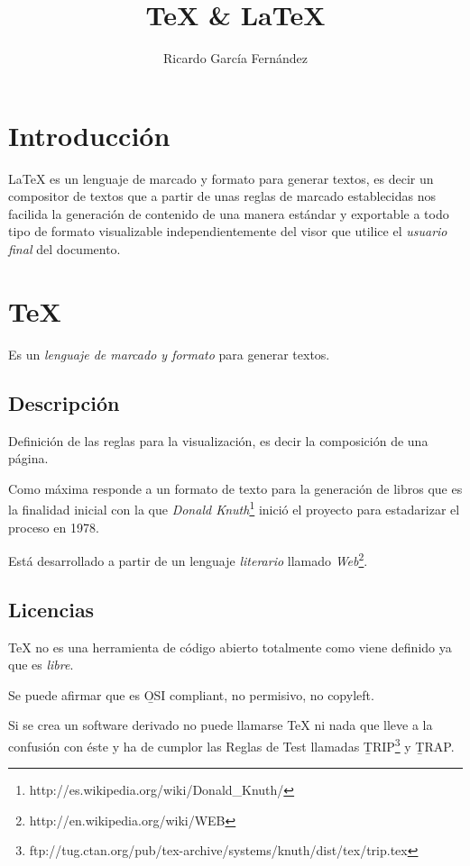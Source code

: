 \documentclass[11pt]{article}
\title{\textbf{\TeX{} \& \LaTeX{}}}
\author{Ricardo Garc\'ia Fern\'andez}
\date{}
\begin{document}
\maketitle

\section{Introducci\'on}

\LaTeX{} es un lenguaje de marcado y formato para generar textos, es decir un compositor de textos que a partir de unas reglas de marcado establecidas nos facilida la generaci\'on de contenido de una manera est\'andar y exportable a todo tipo de formato visualizable independientemente del visor que utilice el  \emph{usuario final} del documento.

\section{\TeX{}}

Es un \emph{lenguaje de marcado y formato} para generar textos.

\subsection{Descripci\'on}

Definici\'on de las reglas para la visualizaci\'on, es decir la composici\'on de una p\'agina.

Como m\'axima responde a un formato de texto para la generaci\'on de libros que es la finalidad inicial con la que \emph{Donald Knuth}\footnote{http://es.wikipedia.org/wiki/Donald\_Knuth/} inici\'o el proyecto para estadarizar el proceso en 1978.

Est\'a desarrollado a partir de un lenguaje \emph{literario} llamado \emph{Web}\footnote{http://en.wikipedia.org/wiki/WEB}.

\subsection{Licencias}

\TeX{} no es una herramienta de c\'odigo abierto totalmente como viene definido ya que es \emph{libre}.

Se puede afirmar que es \b{OSI compliant}, no permisivo, no copyleft.

Si se crea un software derivado no puede llamarse \TeX{} ni nada que lleve a la confusi\'on con \'este y ha de cumplor las Reglas de Test llamadas \b{TRIP}\footnote{ftp://tug.ctan.org/pub/tex-archive/systems/knuth/dist/tex/trip.tex} y \b{TRAP}.
\end{document}
